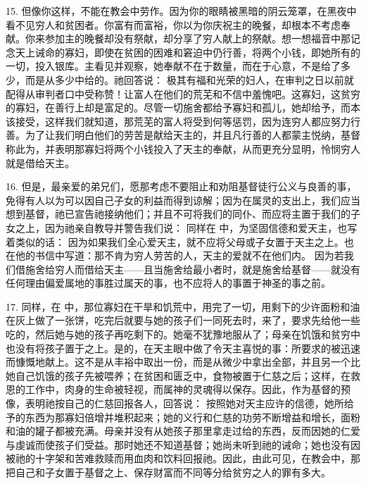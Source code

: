 15. 但像你这样，不能在教会中劳作。因为你的眼睛被黑暗的阴云笼罩，在黑夜中看不见穷人和贫困者。你富有而富裕，你以为你庆祝主的晚餐，却根本不考虑奉献。你来参加主的晚餐却没有祭献，却分享了穷人献上的祭献。想一想福音中那记念天上诫命的寡妇，即使在贫困的困难和窘迫中仍行善，将两个小钱，即她所有的一切，投入银库。主看见并观察，她奉献不在于数量，而在于心意，不是给了多少，而是从多少中给的。祂回答说： 极其有福和光荣的妇人，在审判之日以前就配得从审判者口中受称赞！让富人在他们的荒芜和不信中羞愧吧。这寡妇，这贫穷的寡妇，在善行上却是富足的。尽管一切施舍都给予寡妇和孤儿，她却给予，而本该接受，这样我们就知道，那荒芜的富人将受到何等惩罚，因为连穷人都应努力行善。为了让我们明白他们的劳苦是献给天主的，并且凡行善的人都蒙主悦纳，基督称此为，并表明那寡妇将两个小钱投入了天主的奉献，从而更充分显明，怜悯穷人就是借给天主。\par

16. 但是，最亲爱的弟兄们，愿那考虑不要阻止和劝阻基督徒行公义与良善的事，免得有人以为可以因自己子女的利益而得到谅解；因为在属灵的支出上，我们应当想到基督，祂已宣告祂接纳他们；并且不可将我们的同仆、而应将主置于我们的子女之上，因为祂亲自教导并警告我们说： 同样在  中，为坚固信德和爱天主，也写着类似的话： 因为如果我们全心爱天主，就不应将父母或子女置于天主之上。也在他的书信中写道：那不肯为穷人劳苦的人，天主的爱就不在他们内。 因为若我们借施舍给穷人而借给天主——且当施舍给最小者时，就是施舍给基督——就没有任何理由偏爱属地的事胜过属天的事，也不应将人的事置于神圣的事之前。\par

17. 同样，在  中，那位寡妇在干旱和饥荒中，用完了一切，用剩下的少许面粉和油在灰上做了一张饼，吃完后就要与她的孩子们一同死去时，来了，要求先给他一些吃的，然后她与她的孩子再吃剩下的。她毫不犹豫地服从了；母亲在饥饿和贫穷中也没有将孩子置于之上。是的，在天主眼中做了令天主喜悦的事：所要求的被迅速而慷慨地献上。这不是从丰裕中取出一份，而是从微少中拿出全部，并且另一个比她自己饥饿的孩子先被喂养；在贫困和匮乏中，食物被置于仁慈之后；这样，在救恩的工作中，肉身的生命被轻视，而属神的灵魂得以保存。因此，作为基督的预像，表明祂按自己的仁慈回报各人，回答说： 按照她对天主应许的信德，她所给予的东西为那寡妇倍增并堆积起来；她的义行和仁慈的功劳不断增益和增长，面粉和油的罐子都被充满。母亲并没有从她孩子那里拿走过给的东西，反而因她的仁爱与虔诚而使孩子们受益。那时她还不知道基督；她尚未听到祂的诫命；她也没有因被祂的十字架和苦难救赎而用血肉和饮料回报祂。因此，由此可见，在教会中，那把自己和子女置于基督之上、保存财富而不同等分给贫穷之人的罪有多大。\par

